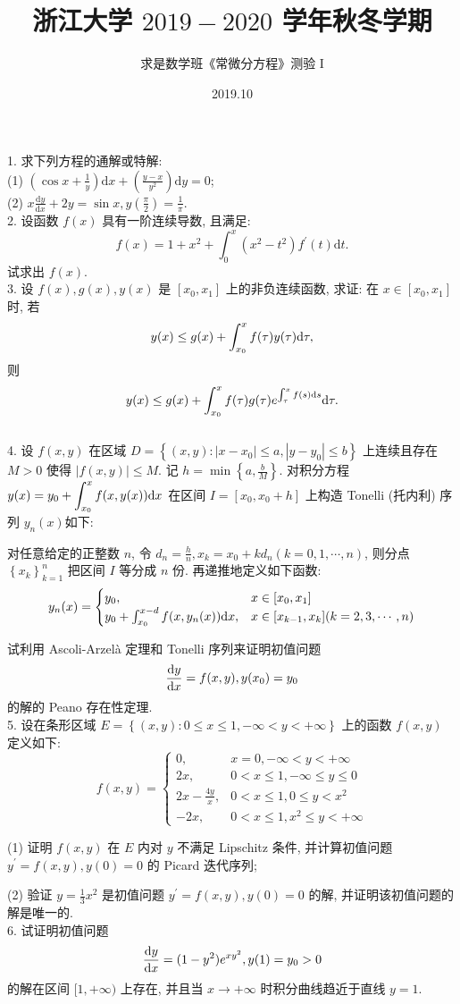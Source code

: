\documentclass[UTF8]{ctexart}
\title{\textbf{浙江大学 $2019-2020$ 学年秋冬学期}}
\author{求是数学班《常微分方程》测验 I}
\date{2019.10}
\begin{document}
\maketitle

1. 求下列方程的通解或特解:
\\

(1) $\displaystyle\left(\cos x+\frac{1}{y}\right)\text{d}x+\left(\frac{y-x}{y^2}\right)\text{d}y=0$;
\\

(2) $\displaystyle x\frac{\text{d}y}{\text{d}x}+2y=\sin x, y\left(\frac{\pi}{2}\right)=\frac{1}{\pi}$.
\\

2. 设函数 $f(x)$ 具有一阶连续导数, 且满足:
\[
f(x)=1+x^2+\int_{0}^{x}(x^2-t^2)f^{\prime}(t)\text{d}t.
\]
试求出 $f(x)$.
\\

3. 设 $f(x),g(x),y(x)$ 是 $[x_0,x_1]$ 上的非负连续函数, 求证: 在 $x\in[x_0,x_1]$ 时, 若
\[
y(x)\leq g(x)+\int_{x_0}^{x}f(\tau)y(\tau){\rm d}\tau,
\]
则
\[
y(x)\leq g(x)+\int_{x_0}^{x}f(\tau)g(\tau)e^{\int_{\tau}^{x}f(s){\rm d}s}{\rm d}\tau.
\]
\\

4. 设 $f(x,y)$ 在区域 $D=\left\{(x,y):|x-x_0|\leq a,|y-y_0|\leq b\right\}$ 上连续且存在 $M>0$ 使得 $|f(x,y)|\leq M$. 记 $\displaystyle h=\min\left\{a,\frac{b}{M}\right\}$. 对积分方程 $\displaystyle y(x)=y_0+\int_{x_0}^{x}f(x,y(x)){\rm d}x$ 在区间 $I=[x_0,x_0+h]$ 上构造 Tonelli (托内利) 序列 $y_n(x)$如下:

对任意给定的正整数 $n$, 令 $\displaystyle d_n=\frac{h}{n},x_k=x_0+kd_n(k=0,1,\cdots,n)$, 则分点 $\displaystyle\left\{x_k\right\}_{k=1}^{n}$ 把区间 $I$ 等分成 $n$ 份. 再递推地定义如下函数:
\[
y_n(x)=
\begin{cases}
  y_0, & x\in[x_0,x_1]\\
  y_0+\int_{x_0}^{x-d}f(x,y_n(x)){\rm d}x, & x\in[x_{k-1},x_k](k=2,3,\cdots,n)
\end{cases}
\]

试利用 Ascoli-Arzel\`{a} 定理和 Tonelli 序列来证明初值问题
\[
\frac{{\rm d}y}{{\rm d}x}=f(x,y),y(x_0)=y_0
\]
的解的 Peano 存在性定理.
\\

5. 设在条形区域 $E=\left\{(x,y):0\leq x\leq1,-\infty<y<+\infty\right\}$ 上的函数 $f(x,y)$ 定义如下:
\[
f(x,y)=
\begin{cases}
  0, & x=0,-\infty<y<+\infty \\
  2x, & 0<x\leq1,-\infty\leq y\leq0 \\
  2x-\displaystyle\frac{4y}{x}, &0<x\leq1,0\leq y<x^2 \\
  -2x, & 0<x\leq1,x^2\leq y<+\infty
\end{cases}
\]

(1) 证明 $f(x,y)$ 在 $E$ 内对 $y$ 不满足 Lipschitz 条件, 并计算初值问题 $y^{\prime}=f(x,y),y(0)=0$ 的 Picard 迭代序列;

(2) 验证 $\displaystyle y=\frac{1}{3}x^2$ 是初值问题 $y^{\prime}=f(x,y),y(0)=0$ 的解, 并证明该初值问题的解是唯一的.
\\

6. 试证明初值问题
\[
\frac{{\rm d}y}{{\rm d}x}=(1-y^2)e^{xy^2},y(1)=y_0>0
\]
的解在区间 $[1,+\infty)$ 上存在, 并且当 $x\rightarrow+\infty$ 时积分曲线趋近于直线 $y=1$.
\end{document}
